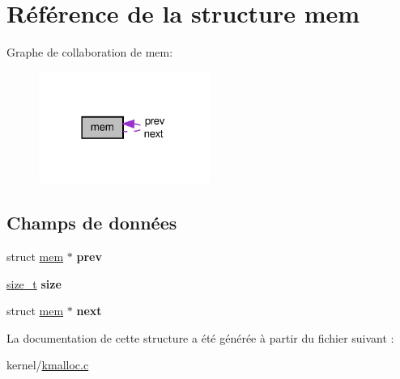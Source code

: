 \hypertarget{structmem}{\section{Référence de la structure mem}
\label{structmem}
}


Graphe de collaboration de mem\-:\nopagebreak
\begin{figure}[H]
\begin{center}
\leavevmode
\includegraphics[width=158pt]{structmem__coll__graph}
\end{center}
\end{figure}
\subsection*{Champs de données}
\begin{DoxyCompactItemize}
\item 
\hypertarget{structmem_a2edfcacfe26d9112b0e4f745c9f75cf7}{struct \hyperlink{structmem}{mem} $\ast$ {\bfseries prev}}\label{structmem_a2edfcacfe26d9112b0e4f745c9f75cf7}

\item 
\hypertarget{structmem_a7d695ebc3fafa769e7e7a75f1d232a18}{\hyperlink{types_8h_a29d85914ddff32967d85ada69854206d}{size\-\_\-t} {\bfseries size}}\label{structmem_a7d695ebc3fafa769e7e7a75f1d232a18}

\item 
\hypertarget{structmem_ad12075ee870ccc6f67f420f09ff37732}{struct \hyperlink{structmem}{mem} $\ast$ {\bfseries next}}\label{structmem_ad12075ee870ccc6f67f420f09ff37732}

\end{DoxyCompactItemize}


La documentation de cette structure a été générée à partir du fichier suivant \-:\begin{DoxyCompactItemize}
\item 
kernel/\hyperlink{kmalloc_8c}{kmalloc.\-c}\end{DoxyCompactItemize}
